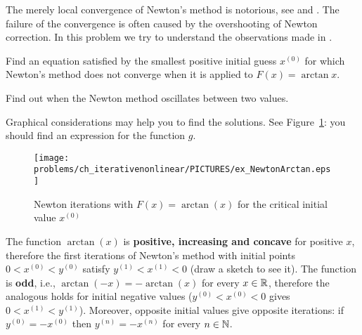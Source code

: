 


\begin{problem}[Newton's method for \texorpdfstring{$F(x):=\arctan x$}{\emph{F(x):=arctan x} \coreproblem}]\label{prb:NewtonArctan}

  The merely local convergence of Newton's method is notorious, see  and .
  The failure of the convergence is often caused by the overshooting of Newton correction.
  In this problem we try to understand the observations made in .

\begin{subproblem}[4]
  Find an equation satisfied by the smallest positive initial guess $x^{(0)}$ for which Newton's method does not converge when it is applied to  $F(x)=\arctan{x}$.
  \begin{hint}
  Find out when the Newton method oscillates between two values.
  \end{hint}
    \begin{hint}
  Graphical considerations may help you to find the solutions. See Figure~\ref{fig:newtonarctan}: you should find an expression for the function $g$.
  \begin{figure}
\caption{Newton iterations with $F(x)=\arctan(x)$ for the critical initial value $x^{(0)}$}
\begin{center} 
\label{fig:newtonarctan}
\texttt{[image: \\problems/ch\_iterativenonlinear/PICTURES/ex\_NewtonArctan.eps]}
\end{center}
\end{figure}
  \end{hint}



\begin{solution}The function $\arctan(x)$ is \textbf{positive, increasing and concave} for positive $x$, therefore the first iterations of Newton's method with initial points $0<x^{(0)}<y^{(0)}$ satisfy $ y^{(1)}<x^{(1)}<0$ (draw a sketch to see it).
The function is \textbf{odd}, i.e., $\arctan(-x)=-\arctan(x)$ for every $x\in\mathbb{R}$, therefore the analogous holds for initial negative values ($y^{(0)}<x^{(0)}<0$ gives $0<x^{(1)}<y^{(1)}$).
Moreover, opposite initial values give opposite iterations: if $y^{(0)}=-x^{(0)}$ then $y^{(n)}=-x^{(n)}$ for every $n\in\mathbb{N}$.


\end{solution}
\end{subproblem}
\end{problem}
